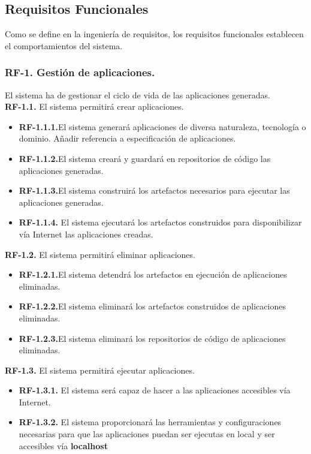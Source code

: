 \documentclass[a4paper,11pt]{book}
\begin{document}
\subsection{Requisitos Funcionales }
Como se define en la ingeniería de requisitos, los requisitos funcionales establecen el comportamientos del sistema.\\



\subsubsection { \textbf{ RF-1. Gestión de aplicaciones.}} El sistema ha de gestionar el ciclo de vida de las aplicaciones generadas.\\

\textbf{RF-1.1.} El sistema permitirá crear aplicaciones.
\begin{itemize}
 \item 	\textbf{RF-1.1.1.}El sistema generará aplicaciones de diversa naturaleza, tecnología o dominio. Añadir referencia a especificación de aplicaciones.
 \item 	\textbf{RF-1.1.2.}El sistema creará y  guardará en repositorios de código las aplicaciones generadas.
  \item \textbf{RF-1.1.3.}El sistema construirá los artefactos necesarios para ejecutar las aplicaciones generadas.
   \item  \textbf{RF-1.1.4.} El sistema ejecutará los artefactos construidos para disponibilizar vía Internet las aplicaciones creadas. \\
\end{itemize}


\textbf{RF-1.2.} El sistema permitirá eliminar aplicaciones.
\begin{itemize}
 \item 	\textbf{RF-1.2.1.}El sistema detendrá los artefactos en ejecución de aplicaciones eliminadas.
  \item 	\textbf{RF-1.2.2.}El sistema eliminará los artefactos construidos de aplicaciones eliminadas.
   \item  \textbf{RF-1.2.3.}El sistema eliminará los repositorios de código de aplicaciones eliminadas.	\\
\end{itemize}


\textbf{RF-1.3.} El sistema permitirá ejecutar aplicaciones.
\begin{itemize}
 \item \textbf{RF-1.3.1.} El sistema será capaz de hacer a las aplicaciones accesibles vía Internet.
 \item  \textbf{RF-1.3.2.} El sistema proporcionará las herramientas  y configuraciones necesarias para que las aplicaciones puedan ser ejecutas en local y ser accesibles vía \textbf{localhost}  \\
\end{itemize}
\end{document}
